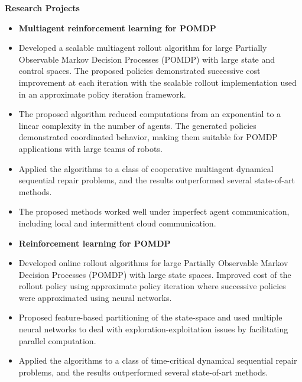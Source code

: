 \documentclass[a4paper,11pt]{article}
\newcommand{\resheading}[1]{{\small \colorbox{mygrey}{\begin{minipage}{0.975\textwidth}{\textbf{#1 \vphantom{p\^{E}}}}\end{minipage}}}}
\begin{document}
	
	
	
	
	
	
	\resheading{\textbf{\large Research Projects}}
	\begin{description}
		\item 
		\begin{itemize}
			\item\textbf{Multiagent reinforcement learning for POMDP}\hfill %
			\item Developed a scalable multiagent rollout algorithm for large Partially Observable Markov Decision Processes (POMDP) with large state and control spaces. 
			The proposed policies demonstrated successive cost improvement at each iteration with the scalable rollout implementation used in an approximate policy iteration framework.
			\item The proposed algorithm reduced computations from an exponential to a linear complexity in the number of agents. The generated policies demonstrated coordinated behavior, making them suitable for POMDP applications with large teams of robots.
			\item Applied the algorithms to a class of cooperative multiagent dynamical sequential repair problems, and the results outperformed several state-of-art methods.
			\item The proposed methods worked well under imperfect agent communication, including local and intermittent cloud communication.
		\end{itemize}
		\item 
		\begin{itemize}
			\item\textbf{Reinforcement learning for POMDP}
			\item Developed online rollout algorithms for large Partially Observable Markov Decision Processes (POMDP) with large state spaces. Improved cost of the rollout policy using approximate policy iteration where successive policies were approximated using neural networks.
			\item Proposed feature-based partitioning of the state-space and used multiple neural networks to deal with exploration-exploitation issues by facilitating parallel computation.
			\item Applied the algorithms to a class of time-critical dynamical sequential repair problems, and the results outperformed several state-of-art methods.
			
		\end{itemize}
		
	\end{description}
	
\end{document}
